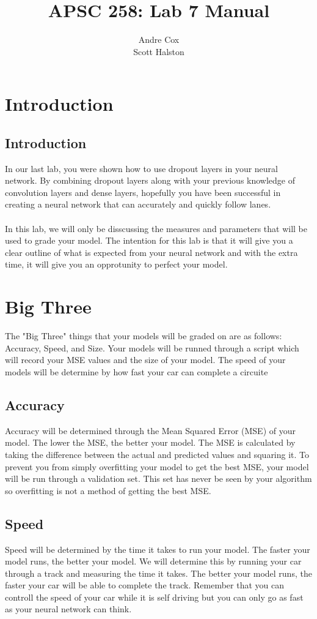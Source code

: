 \documentclass[11pt]{report}
\title{APSC 258: Lab 7 Manual}
\author{Andre Cox \\ Scott Halston}
\begin{document}
\maketitle
\tableofcontents

\clearpage

\chapter{Introduction}
\section{Introduction}
In our last lab, you were shown how to use dropout layers in your neural network. By combining dropout layers along with your previous knowledge of convolution layers and dense layers, hopefully you have been successful in creating a neural network that can accurately and quickly follow lanes.
\\ \\
In this lab, we will only be disscussing the measures and parameters that will be used to grade your model. The intention for this lab is that it will give you a clear outline of what is expected from your neural network and with the extra time, it will give you an opprotunity to perfect your model.

\chapter{Big Three}
The "Big Three" things that your models will be graded on are as follows:
    Accuracy, Speed, and Size.
Your models will be runned through a script which will record your MSE values and the size of your model. The speed of your models will be determine by how fast your car can complete a circuite

\section{Accuracy}
Accuracy will be determined through the Mean Squared Error (MSE) of your model. The lower the MSE, the better your model. The MSE is calculated by taking the difference between the actual and predicted values and squaring it. To prevent you from simply overfitting your model to get the best MSE, your model will be run through a validation set. This set has never be seen by your algorithm so overfitting is not a method of getting the best MSE.

\section{Speed}
Speed will be determined by the time it takes to run your model. The faster your model runs, the better your model. We will determine this by running your car through a track and measuring the time it takes. The better your model runs, the faster your car will be able to complete the track. Remember that you can controll the speed of your car while it is self driving but you can only go as fast as your neural network can think. 
\end{document}
